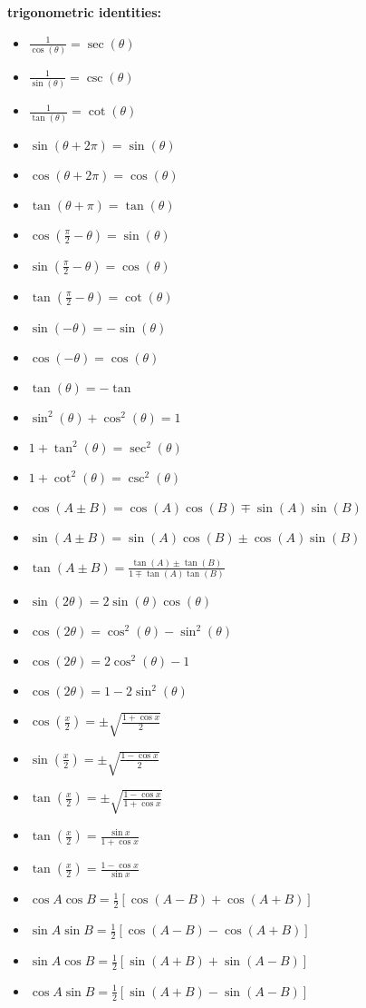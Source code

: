 \documentclass{article}
\begin{document}
\textbf{trigonometric identities:}
\begin{itemize}
	\item $\frac{1}{\cos(\theta)} = \sec(\theta)$	
	\item $\frac{1}{\sin(\theta)} = \csc(\theta) $
	\item $\frac{1}{\tan(\theta)} = \cot(\theta)$
	\item $\sin(\theta + 2\pi) = \sin(\theta)$
	\item $\cos(\theta + 2\pi) = \cos(\theta)$
	\item $\tan(\theta + \pi) = \tan(\theta)$
	\item $\cos(\frac{\pi}{2} - \theta) = \sin(\theta)$
	\item $\sin(\frac{\pi}{2} - \theta) = \cos(\theta)$
	\item $\tan(\frac{\pi}{2} - \theta) = \cot(\theta)$
	\item $\sin(-\theta) = -\sin(\theta)$
	\item $\cos(-\theta) = \cos(\theta)$
	\item $\tan(\theta) = -\tan$
	\item $\sin^2(\theta) + \cos^2(\theta) = 1$
	\item $1 + \tan^2(\theta) = \sec^2(\theta)$
	\item $1 + \cot^2(\theta) = \csc^2(\theta)$
	\item $\cos(A \pm B) = \cos(A)\cos(B) \mp \sin(A)\sin(B)$		
	\item $\sin(A \pm B) = \sin(A)\cos(B) \pm \cos(A)\sin(B)$
	\item $\tan(A \pm B) = \frac{\tan(A) \pm \tan(B)}{1 \mp \tan(A)\tan(B)}$
	\item $\sin(2\theta) = 2\sin(\theta)\cos(\theta)$
	\item $\cos(2\theta) = \cos^2(\theta) - \sin^2(\theta)$		
	\item $\cos(2\theta) = 2\cos^2(\theta) - 1$
	\item $\cos(2\theta) = 1 - 2\sin^2(\theta)$
	\item $\cos\left(\frac{x}{2}\right) = \pm \sqrt{\frac{1 + \cos x}{2}}$
	\item $\sin\left(\frac{x}{2}\right) = \pm \sqrt{\frac{1 - \cos x}{2}}$
	\item $\tan\left(\frac{x}{2}\right) = \pm \sqrt{\frac{1 - \cos x}{1 + \cos x}}$
	\item $\tan\left(\frac{x}{2}\right) = \frac{\sin x}{1 + \cos x}$
	\item $\tan\left(\frac{x}{2}\right) = \frac{1 - \cos x}{\sin x}$
	\item $\cos A \cos B = \frac{1}{2} \left[ \cos(A - B) + \cos(A + B) \right]$
	\item $\sin A \sin B = \frac{1}{2} \left[ \cos(A - B) - \cos(A + B) \right]$
	\item $\sin A \cos B = \frac{1}{2} \left[ \sin(A + B) + \sin(A - B) \right]$
	\item $\cos A \sin B = \frac{1}{2} \left[ \sin(A + B) - \sin(A - B) \right]$
\end{itemize}
\end{document}
